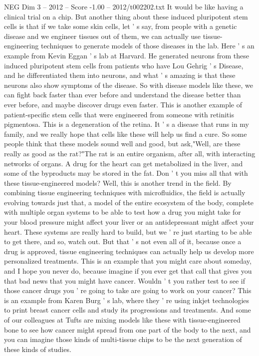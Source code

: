 \begin{textsample}{NEG Dim 3 – 2012 – Score -1.00 – 2012/t002202.txt}
It would be like having a clinical trial on a chip.
But another thing about these induced pluripotent stem cells is that if we take some skin cells, let ' s say, from people with a genetic disease and we engineer tissues out of them, we can actually use tissue-engineering techniques to generate models of those diseases in the lab.
Here ' s an example from Kevin Eggan ' s lab at Harvard.
He generated neurons from these induced pluripotent stem cells from patients who have Lou Gehrig ' s Disease, and he differentiated them into neurons, and what ' s amazing is that these neurons also show symptoms of the disease.
So with disease models like these, we can fight back faster than ever before and understand the disease better than ever before, and maybe discover drugs even faster.
This is another example of patient-specific stem cells that were engineered from someone with retinitis pigmentosa.
This is a degeneration of the retina.
It ' s a disease that runs in my family, and we really hope that cells like these will help us find a cure.
So some people think that these models sound well and good, but ask,"Well, are these really as good as the rat?"The rat is an entire organism, after all, with interacting networks of organs.
A drug for the heart can get metabolized in the liver, and some of the byproducts may be stored in the fat.
Don ' t you miss all that with these tissue-engineered models?
Well, this is another trend in the field.
By combining tissue engineering techniques with microfluidics, the field is actually evolving towards just that, a model of the entire ecosystem of the body, complete with multiple organ systems to be able to test how a drug you might take for your blood pressure might affect your liver or an antidepressant might affect your heart.
These systems are really hard to build, but we ' re just starting to be able to get there, and so, watch out.
But that ' s not even all of it, because once a drug is approved, tissue engineering techniques can actually help us develop more personalized treatments.
This is an example that you might care about someday, and I hope you never do, because imagine if you ever get that call that gives you that bad news that you might have cancer.
Wouldn ' t you rather test to see if those cancer drugs you ' re going to take are going to work on your cancer?
This is an example from Karen Burg ' s lab, where they ' re using inkjet technologies to print breast cancer cells and study its progressions and treatments.
And some of our colleagues at Tufts are mixing models like these with tissue-engineered bone to see how cancer might spread from one part of the body to the next, and you can imagine those kinds of multi-tissue chips to be the next generation of these kinds of studies.

\end{textsample}
